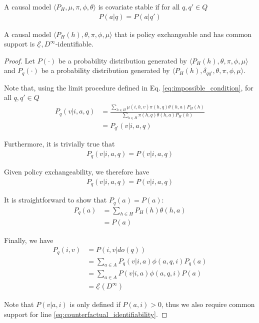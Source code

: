 \begin{definition}
A causal model $\langle P_H, \mu,\pi,\phi,\theta\rangle$ is covariate stable if for all $q,q'\in Q$
\begin{align}
  P(a|q) = P(a|q')
\end{align}
\end{definition}


\begin{theorem}\label{th:pex_unc_ident}
A causal model $\langle P_H(h),\theta,\pi,\phi,\mu \rangle$ that is policy exchangeable and has common support is $\underline{\mathscr{E}}, D^\infty$-identifiable.
\end{theorem}

\begin{proof}
Let $P(\cdot)$ be a probability distribution generated by $\langle P_H(h),\theta,\pi,\phi,\mu \rangle$ and $P_q(\cdot)$ be a probability distribution generated by $\langle P_H(h),\delta_{qq'},\theta,\pi,\phi,\mu \rangle$.

Note that, using the limit procedure defined in Eq. \ref{eq:impossible_condition}, for all $q,q'\in Q$
\begin{align}
    P_q(v|i,a,q) &= \frac{\sum_{h\in H} \mu(i,h,v)\pi(h,q) \theta(h,a) P_H(h)}{\sum_{h\in H} \pi(h,q) \theta(h,a) P_H(h)} \\
                 &= P_{q'}(v|i,a,q)
\end{align}

Furthermore, it is trivially true that
\begin{align}
    P_q(v|i,a,q) = P(v|i,a,q)
\end{align}

Given policy exchangeability, we therefore have
\begin{align}
    P_q(v|i,a,q) = P(v|i,a,q)
\end{align}

It is straightforward to show that $P_q(a) = P(a)$:
\begin{align}
    P_q(a) &= \sum_{h\in H} P_H(h) \theta(h,a) \\
           &= P(a)
\end{align}

Finally, we have
\begin{align}
    P_q(i,v) &= P(i,v|do(q))\\
             &= \sum_{a\in A} P_q(v|i,a) \phi(a,q,i) P_q(a)\\
             &= \sum_{a\in A} P(v|i,a) \phi(a,q,i) P(a)\\ \label{eq:counterfactual_identifiability}
             &= \underline{\mathscr{E}}(D^\infty)
\end{align}

Note that $P(v|a,i)$ is only defined if $P(a,i)>0$, thus we also require common support for line \ref{eq:counterfactual_identifiability}.
\end{proof}

